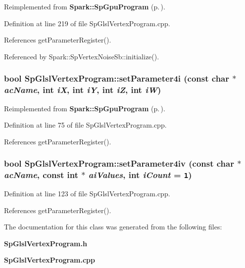 Reimplemented from {\bf Spark::Sp\-Gpu\-Program} {\rm (p.\,\pageref{classSpark_1_1SpGpuProgram_a27})}.

Definition at line 219 of file Sp\-Glsl\-Vertex\-Program.cpp.

References get\-Parameter\-Register().

Referenced by Spark::Sp\-Vertex\-Noise\-Sb::initialize().
\subsubsection{\setlength{\rightskip}{0pt plus 5cm}bool Sp\-Glsl\-Vertex\-Program::set\-Parameter4i (const char $\ast$ {\em ac\-Name}, int {\em i\-X}, int {\em i\-Y}, int {\em i\-Z}, int {\em i\-W})\hspace{0.3cm}{\tt  [virtual]}}\label{classSpark_1_1SpGlslVertexProgram_a4}




Reimplemented from {\bf Spark::Sp\-Gpu\-Program} {\rm (p.\,\pageref{classSpark_1_1SpGpuProgram_a15})}.

Definition at line 75 of file Sp\-Glsl\-Vertex\-Program.cpp.

References get\-Parameter\-Register().
\subsubsection{\setlength{\rightskip}{0pt plus 5cm}bool Sp\-Glsl\-Vertex\-Program::set\-Parameter4iv (const char $\ast$ {\em ac\-Name}, const int $\ast$ {\em ai\-Values}, int {\em i\-Count} = {\tt 1})\hspace{0.3cm}{\tt  [virtual]}}\label{classSpark_1_1SpGlslVertexProgram_a8}


Definition at line 123 of file Sp\-Glsl\-Vertex\-Program.cpp.

References get\-Parameter\-Register().

The documentation for this class was generated from the following files:\begin{CompactItemize}
\item 
{\bf Sp\-Glsl\-Vertex\-Program.h}\item 
{\bf Sp\-Glsl\-Vertex\-Program.cpp}\end{CompactItemize}

